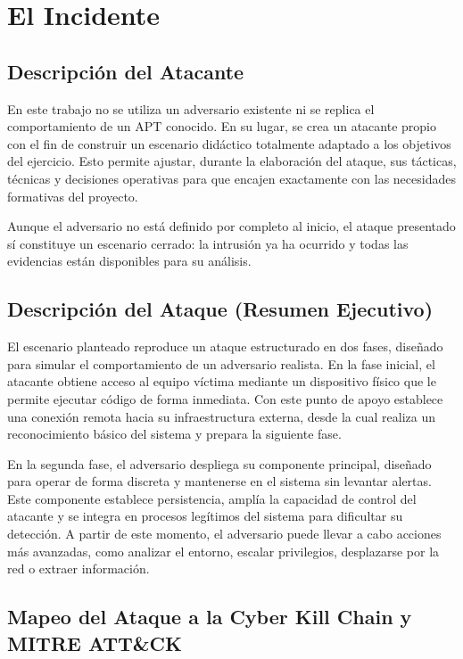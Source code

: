 \chapter{El Incidente}
\label{chap:incidente}

\section{Descripción del Atacante}

En este trabajo no se utiliza un adversario existente ni se replica el comportamiento de un APT conocido. En su lugar, se crea un atacante propio con el fin de construir un escenario didáctico totalmente adaptado a los objetivos del ejercicio. Esto permite ajustar, durante la elaboración del ataque, sus tácticas, técnicas y decisiones operativas para que encajen exactamente con las necesidades formativas del proyecto.

Aunque el adversario no está definido por completo al inicio, el ataque presentado sí constituye un escenario cerrado: la intrusión ya ha ocurrido y todas las evidencias están disponibles para su análisis.

\section{Descripción del Ataque (Resumen Ejecutivo)}

El escenario planteado reproduce un ataque estructurado en dos fases, diseñado para simular el comportamiento de un adversario realista. En la fase inicial, el atacante obtiene acceso al equipo víctima mediante un dispositivo físico que le permite ejecutar código de forma inmediata. Con este punto de apoyo establece una conexión remota hacia su infraestructura externa, desde la cual realiza un reconocimiento básico del sistema y prepara la siguiente fase.

En la segunda fase, el adversario despliega su componente principal, diseñado para operar de forma discreta y mantenerse en el sistema sin levantar alertas. Este componente establece persistencia, amplía la capacidad de control del atacante y se integra en procesos legítimos del sistema para dificultar su detección. A partir de este momento, el adversario puede llevar a cabo acciones más avanzadas, como analizar el entorno, escalar privilegios, desplazarse por la red o extraer información.

\section{Mapeo del Ataque a la Cyber Kill Chain y MITRE ATT\&CK}


